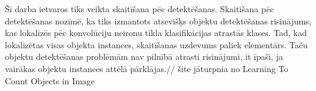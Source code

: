 Šī darba ietvaros tiks veikta skaitīšana pēc detektēšanas. Skaitīšana pēc detektēšanas nozīmē, ka tiks izmantots atsevišķs objektu detektēšanas risinājums, kas lokalizēs pēc konvolūciju neironu tīkla klasifikācijas atrastās klases. Tad, kad lokalizētas visas objekta instances, skaitīšanas uzdevums paliek elementārs. Taču objektu detektēšanas problēmām nav pilnībā atrasti risinājumi, it īpaši, ja vairākas objektu instances attēlā pārklājas.// šite jāturpnia no Learning To Count Objects in Image